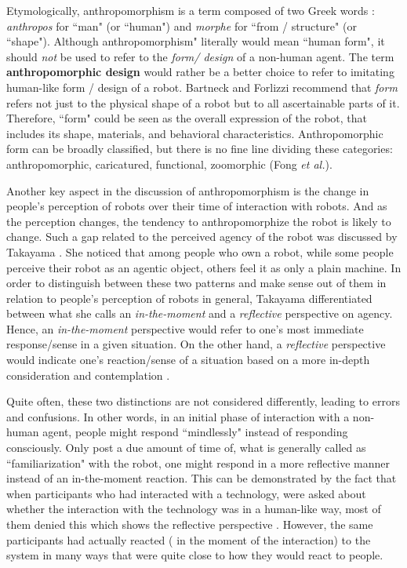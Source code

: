 \documentclass[a4,twocolumn,10pt]{article}
\newcommand{\etal}{{\textit{et al.\xspace}}}
\begin{document}
Etymologically, anthropomorphism is a term composed of two Greek words :
\textit{anthropos} for ``man" (or ``human") and \textit{morphe} for ``from /
structure" (or ``shape"). Although anthropomorphism" literally would mean
``human form", it should \textit{not} be used to refer to the \textit{form/
design} of a non-human agent. The term \textbf{anthropomorphic design} would
rather be a better choice to refer to imitating human-like form / design of a
robot. Bartneck and Forlizzi\cite{bartneck_shaping_2004} recommend that \emph{form}
refers not just to the physical shape of a robot but to all ascertainable parts
of it. Therefore, ``form" could be seen as the overall expression of the robot,
that includes its shape, materials, and behavioral characteristics.
Anthropomorphic form can be broadly classified, but there is no fine line
dividing these categories: anthropomorphic, caricatured, functional,
zoomorphic (Fong \etal \cite{fong_survey_2003}).

Another key aspect in the discussion of anthropomorphism is the change in
people's perception of robots over their time of interaction with robots. And as
the perception changes, the tendency to anthropomorphize the robot is likely to
change. Such a gap related to the perceived agency of the robot was discussed by
Takayama \cite{takayama_perspectives_2012}. She noticed that among people who
own a robot, while some people perceive their robot as an agentic object, others
feel  it as only a plain machine. In order to distinguish between these two
patterns and make sense out of them in relation to people's perception of robots
in general, Takayama differentiated between what she calls an
\emph{in-the-moment} and a \emph{reflective} perspective on agency. Hence, an
\emph{in-the-moment} perspective would refer to one's most immediate
response/sense in a given situation. On the other hand, a \emph{reflective}
perspective would indicate one's reaction/sense of a situation based on a more
in-depth  consideration and contemplation \cite{takayama_perspectives_2012}. 

Quite often, these two distinctions are not considered differently, leading to
errors and confusions.  In other words, in an initial phase of interaction with
a non-human agent, people might respond ``mindlessly" instead of responding
consciously\cite{nass_machines_2000}. Only post a due amount of
time of, what is generally called as ``familiarization" with the robot, one
might respond in a more reflective manner instead of an in-the-moment reaction.
This can be demonstrated by the fact that when participants who had interacted
with a technology, were asked about whether the interaction with the technology
was in a human-like way, most of them denied this which shows the reflective
perspective . However, the same participants had actually reacted ( in the
moment of the interaction) to the system in many ways that were quite close to
how they would react to people\cite{reeves_media_1996}.
\end{document}

